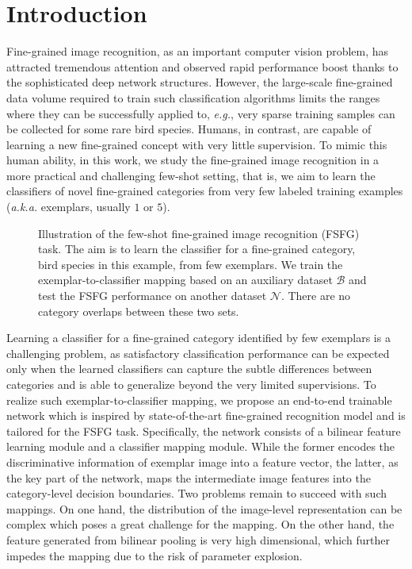 \documentclass[10pt,twocolumn,letterpaper]{article}
\begin{document}
\section{Introduction}

Fine-grained image recognition, as an important computer vision problem, has attracted tremendous attention and observed rapid performance boost thanks to the sophisticated deep network structures. However, the large-scale fine-grained data volume required to train such classification algorithms limits the ranges where they can be successfully applied to, \emph{e.g.}, very sparse training samples can be collected for some rare bird species. Humans, in contrast, are capable of learning a new fine-grained concept with very little supervision. To mimic this human ability, in this work, we study the fine-grained image recognition in a more practical and challenging few-shot setting, that is, we aim to learn the classifiers of novel fine-grained categories from very few labeled training examples (\emph{a.k.a.} exemplars, usually $1$ or $5$). 

\begin{figure}[t!]
\caption{Illustration of the few-shot fine-grained image recognition (FSFG) task. The aim is to learn the classifier for a fine-grained category, bird species in this example, from few exemplars. We train the exemplar-to-classifier mapping based on an auxiliary dataset $\mathcal{B}$ and test the FSFG performance on another dataset $\mathcal{N}$. There are no category overlaps between these two sets.
}
\label{fig:fewshot}
\end{figure}

Learning a classifier for a fine-grained category identified by few exemplars is a challenging problem, as satisfactory classification performance can be expected only when the learned classifiers can capture the subtle differences between categories and is able to generalize beyond the very limited supervisions. To realize such exemplar-to-classifier mapping, we propose an end-to-end trainable network which is inspired by state-of-the-art fine-grained recognition model and is tailored for the FSFG task. Specifically, the network consists of a bilinear feature learning module and a classifier mapping module. While the former encodes the discriminative information of exemplar image into a feature vector, the latter, as the key part of the network, maps the intermediate image features into the category-level decision boundaries. Two problems remain to succeed with such mappings. On one hand, the distribution of the image-level representation can be complex which poses a great challenge for the mapping. On the other hand, the feature generated from bilinear pooling is very high dimensional, which further impedes the mapping due to the risk of parameter explosion.
\end{document}
